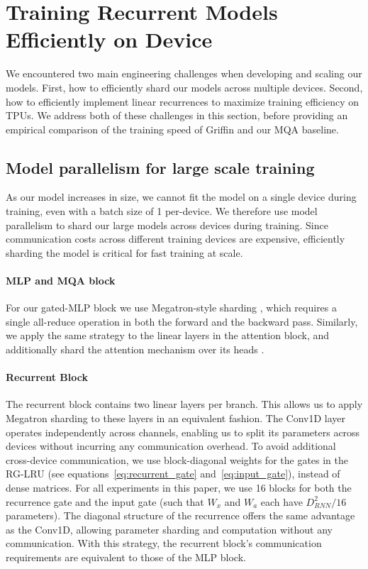 \documentclass[11pt, a4paper, logo, onecolumn]{googledeepmind}
\theoremstyle{definition}
\begin{document}
\section{Training Recurrent Models Efficiently on Device}
\label{sec:training_efficiency}

We encountered two main engineering challenges when developing and scaling our models.
First, how to efficiently shard our models across multiple devices. 
Second, how to efficiently implement linear recurrences to maximize training efficiency on TPUs. 
We address both of these challenges in this section, before providing an empirical comparison of the training speed of Griffin and our MQA baseline.

\subsection{Model parallelism for large scale training}

As our model increases in size, we cannot fit the model on a single device during training, even with a batch size of 1 per-device. 
We therefore use model parallelism to shard our large models across devices during training. 
Since communication costs across different training devices are expensive, efficiently sharding the model is critical for fast training at scale. 

\paragraph{MLP and MQA block} 
For our gated-MLP block we use Megatron-style sharding \citep{shoeybi2019megatron}, which requires  a single all-reduce operation in both the forward and the backward pass. 
Similarly, we apply the same strategy to the linear layers in the attention block, and additionally shard the attention mechanism over its heads  \citep{narayanan2021efficient}.

\paragraph{Recurrent Block}

The recurrent block contains two linear layers per branch. This allows us to apply Megatron sharding to these layers in an equivalent fashion. The Conv1D layer operates independently across channels, enabling us to split its parameters across devices without incurring any communication overhead. 
To avoid additional cross-device communication, we use block-diagonal weights for the gates in the RG-LRU (see equations~\ref{eq:recurrent_gate} and~\ref{eq:input_gate}), instead of dense matrices. For all experiments in this paper, we use 16 blocks for both the recurrence gate and the input gate (such that $W_x$ and $W_a$ each have $D_{RNN}^2/16$ parameters).
The diagonal structure of the recurrence offers the same advantage as the Conv1D, allowing parameter sharding and computation without any communication. %
With this strategy, the recurrent block's communication requirements are equivalent to those of the MLP block.
\end{document}
